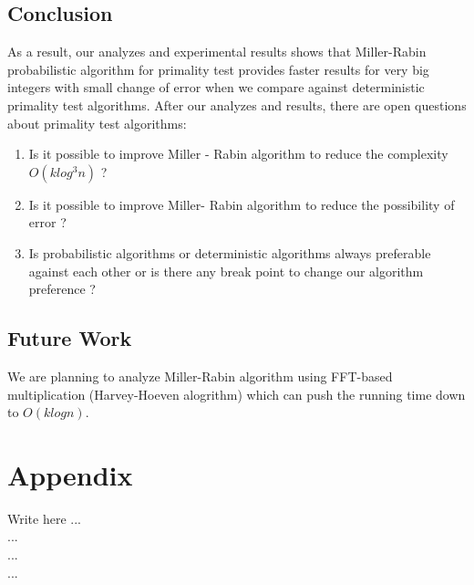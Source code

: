 \documentclass[conference]{IEEEtran}
\begin{document}
\subsection{Conclusion}
As a result, our analyzes and experimental results shows that Miller-Rabin probabilistic algorithm for primality test provides faster results for very big integers with small change of error when we compare against deterministic primality test algorithms. After our analyzes and results, there are open questions about primality test algorithms:
\begin{enumerate}
    \item Is it possible to improve Miller - Rabin algorithm to reduce the complexity $O(klog^{3}n)$ ?
    \item Is it possible to improve Miller- Rabin algorithm to reduce the possibility of error ?
    \item Is probabilistic algorithms or deterministic algorithms always preferable against each other or is there any break point to change our algorithm preference ? 
\end{enumerate}
\subsection{Future Work}
We are planning to analyze Miller-Rabin algorithm using FFT-based multiplication (Harvey-Hoeven alogrithm) which can push the running time down to $O(klogn).$  
    
\printbibliography

\section*{Appendix}
    Write here ... \\
    ...  \\
    ...  \\
    ...  
\end{document}
